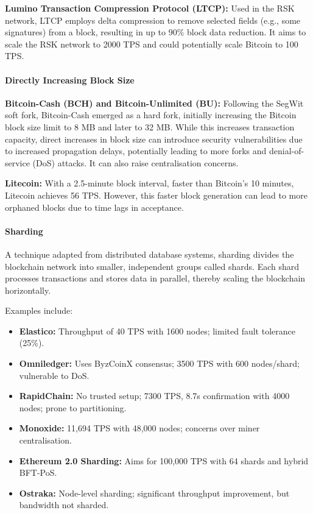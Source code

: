 \textbf{Lumino Transaction Compression Protocol (LTCP):} Used in the RSK network, LTCP employs delta compression to remove selected fields (e.g., some signatures) from a block, resulting in up to 90\% block data reduction. It aims to scale the RSK network to 2000 TPS and could potentially scale Bitcoin to 100 TPS.

\paragraph{Directly Increasing Block Size}
\textbf{Bitcoin-Cash (BCH) and Bitcoin-Unlimited (BU):} Following the SegWit soft fork, Bitcoin-Cash emerged as a hard fork, initially increasing the Bitcoin block size limit to 8 MB and later to 32 MB. While this increases transaction capacity, direct increases in block size can introduce security vulnerabilities due to increased propagation delays, potentially leading to more forks and denial-of-service (DoS) attacks. It can also raise centralisation concerns.

\textbf{Litecoin:} With a 2.5-minute block interval, faster than Bitcoin's 10 minutes, Litecoin achieves 56 TPS. However, this faster block generation can lead to more orphaned blocks due to time lags in acceptance.

\paragraph{Sharding}
A technique adapted from distributed database systems, sharding divides the blockchain network into smaller, independent groups called shards. Each shard processes transactions and stores data in parallel, thereby scaling the blockchain horizontally.

Examples include:
\begin{itemize}
  \item \textbf{Elastico:} Throughput of 40 TPS with 1600 nodes; limited fault tolerance (25\%).
  \item \textbf{Omniledger:} Uses ByzCoinX consensus; 3500 TPS with 600 nodes/shard; vulnerable to DoS.
  \item \textbf{RapidChain:} No trusted setup; 7300 TPS, 8.7s confirmation with 4000 nodes; prone to partitioning.
  \item \textbf{Monoxide:} 11,694 TPS with 48,000 nodes; concerns over miner centralisation.
  \item \textbf{Ethereum 2.0 Sharding:} Aims for 100,000 TPS with 64 shards and hybrid BFT-PoS.
  \item \textbf{Ostraka:} Node-level sharding; significant throughput improvement, but bandwidth not sharded.
\end{itemize}

